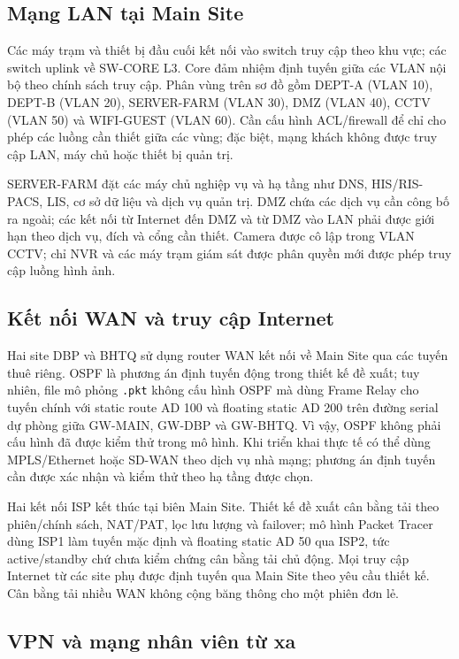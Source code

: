 \subsection{Mạng LAN tại Main Site}

Các máy trạm và thiết bị đầu cuối kết nối vào switch truy cập theo khu vực; các switch uplink về SW-CORE L3. Core đảm nhiệm định tuyến giữa các VLAN nội bộ theo chính sách truy cập. Phân vùng trên sơ đồ gồm DEPT-A (VLAN 10), DEPT-B (VLAN 20), SERVER-FARM (VLAN 30), DMZ (VLAN 40), CCTV (VLAN 50) và WIFI-GUEST (VLAN 60). Cần cấu hình ACL/firewall để chỉ cho phép các luồng cần thiết giữa các vùng; đặc biệt, mạng khách không được truy cập LAN, máy chủ hoặc thiết bị quản trị.

SERVER-FARM đặt các máy chủ nghiệp vụ và hạ tầng như DNS, HIS/RIS-PACS, LIS, cơ sở dữ liệu và dịch vụ quản trị. DMZ chứa các dịch vụ cần công bố ra ngoài; các kết nối từ Internet đến DMZ và từ DMZ vào LAN phải được giới hạn theo dịch vụ, đích và cổng cần thiết. Camera được cô lập trong VLAN CCTV; chỉ NVR và các máy trạm giám sát được phân quyền mới được phép truy cập luồng hình ảnh.

\subsection{Kết nối WAN và truy cập Internet}

Hai site DBP và BHTQ sử dụng router WAN kết nối về Main Site qua các tuyến thuê riêng. OSPF là phương án định tuyến động trong thiết kế đề xuất; tuy nhiên, file mô phỏng \texttt{.pkt} không cấu hình OSPF mà dùng Frame Relay cho tuyến chính với static route AD 100 và floating static AD 200 trên đường serial dự phòng giữa GW-MAIN, GW-DBP và GW-BHTQ. Vì vậy, OSPF không phải cấu hình đã được kiểm thử trong mô hình. Khi triển khai thực tế có thể dùng MPLS/Ethernet hoặc SD-WAN theo dịch vụ nhà mạng; phương án định tuyến cần được xác nhận và kiểm thử theo hạ tầng được chọn.

Hai kết nối ISP kết thúc tại biên Main Site. Thiết kế đề xuất cân bằng tải theo phiên/chính sách, NAT/PAT, lọc lưu lượng và failover; mô hình Packet Tracer dùng ISP1 làm tuyến mặc định và floating static AD 50 qua ISP2, tức active/standby chứ chưa kiểm chứng cân bằng tải chủ động. Mọi truy cập Internet từ các site phụ được định tuyến qua Main Site theo yêu cầu thiết kế. Cân bằng tải nhiều WAN không cộng băng thông cho một phiên đơn lẻ.

\subsection{VPN và mạng nhân viên từ xa}

